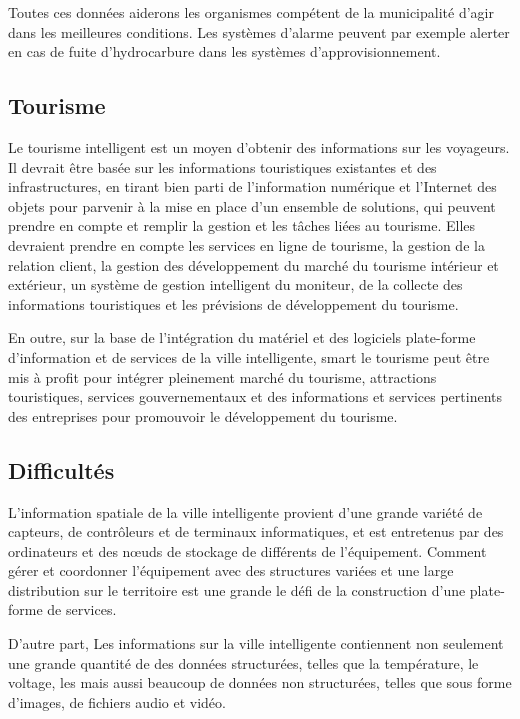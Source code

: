 Toutes ces données aiderons les organismes compétent de la municipalité d'agir dans les meilleures
conditions. Les systèmes d'alarme peuvent par exemple alerter en cas de fuite d'hydrocarbure dans
les systèmes d'approvisionnement.

\subsection{Tourisme}

Le tourisme intelligent est un moyen d'obtenir des informations sur les voyageurs.
Il devrait être basée sur les informations touristiques existantes et des infrastructures,
en tirant bien parti de l'information numérique et l'Internet des objets pour parvenir
à la mise en place d'un ensemble de solutions, qui peuvent prendre en compte et remplir
la gestion et les tâches liées au tourisme.
Elles devraient prendre en compte
les services en ligne de tourisme,
la gestion de la relation client,
la gestion des développement du marché du tourisme intérieur et extérieur,
un système de gestion intelligent du moniteur,
de la collecte des informations touristiques
et les prévisions de développement du tourisme.

En outre, sur la base de l'intégration du matériel et des logiciels plate-forme d'information
et de services de la ville intelligente, smart le tourisme peut être mis à profit pour
intégrer pleinement marché du tourisme, attractions touristiques, services gouvernementaux
et des informations et services pertinents des entreprises pour promouvoir le développement du tourisme.

\subsection{Difficultés}

L'information spatiale de la ville intelligente provient d'une grande variété de capteurs,
de contrôleurs et de terminaux informatiques, et est entretenus par des ordinateurs et des nœuds
de stockage de différents de l'équipement.
Comment gérer et coordonner l'équipement avec des structures variées et une large distribution sur
le territoire est une grande le défi de la construction d'une plate-forme de services.

D'autre part, Les informations sur la ville intelligente contiennent non
seulement une grande quantité de des données structurées, telles que la température, le voltage,
les mais aussi beaucoup de données non structurées, telles que sous forme d'images, de fichiers audio et vidéo.

